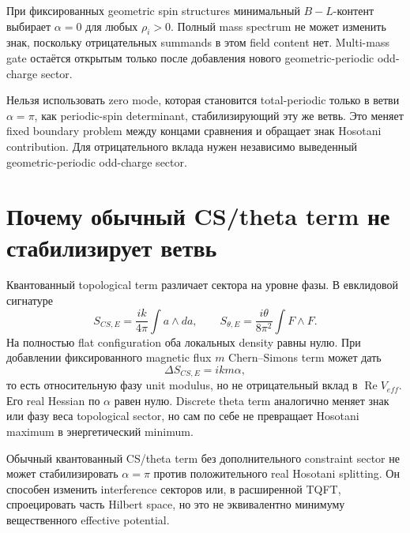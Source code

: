 \begin{theorem}
При фиксированных geometric spin structures минимальный \(B-L\)-контент
выбирает \(\alpha=0\) для любых \(\rho_i>0\). Полный mass spectrum не может
изменить знак, поскольку отрицательных summands в этом field content нет.
Multi-mass gate остаётся открытым только после добавления нового
geometric-periodic odd-charge sector.
\end{theorem}

\begin{nogocriterion}
Нельзя использовать zero mode, которая становится total-periodic только в
ветви \(\alpha=\pi\), как periodic-spin determinant, стабилизирующий эту же
ветвь. Это меняет fixed boundary problem между концами сравнения и обращает
знак Hosotani contribution. Для отрицательного вклада нужен независимо
выведенный geometric-periodic odd-charge sector.
\end{nogocriterion}

\section{Почему обычный CS/theta term не стабилизирует ветвь}

Квантованный topological term различает сектора на уровне фазы. В евклидовой
сигнатуре
\begin{equation}
 S_{CS,E}=\frac{ik}{4\pi}\int a\wedge da,
 \qquad
 S_{\theta,E}=\frac{i\theta}{8\pi^2}\int F\wedge F.
\end{equation}
На полностью flat configuration оба локальных density равны нулю. При
добавлении фиксированного magnetic flux \(m\) Chern--Simons term может дать
\begin{equation}
 \Delta S_{CS,E}=ikm\alpha,
\end{equation}
то есть относительную фазу unit modulus, но не отрицательный вклад в
\(\operatorname{Re}V_{eff}\). Его real Hessian по \(\alpha\) равен нулю.
Discrete theta term аналогично меняет знак или фазу веса topological sector,
но сам по себе не превращает Hosotani maximum в энергетический minimum.

\begin{nogocriterion}
Обычный квантованный CS/theta term без дополнительного constraint sector не
может стабилизировать \(\alpha=\pi\) против положительного real Hosotani
splitting. Он способен изменить interference секторов или, в расширенной
TQFT, спроецировать часть Hilbert space, но это не эквивалентно минимуму
вещественного effective potential.
\end{nogocriterion}

